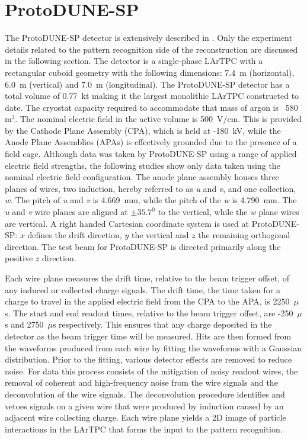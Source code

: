 \section{ProtoDUNE-SP}
\label{sec:protodunesp}
The ProtoDUNE-SP detector is extensively described in \cite{pdtdr}.  Only the experiment details related to the pattern recognition side of the reconstruction are discussed in the following section.  The detector is a single-phase LArTPC with a rectangular cuboid geometry with the following dimensions: 7.4~m (horizontal), 6.0~m (vertical) and 7.0~m (longitudinal).  The ProtoDUNE-SP detector has a total volume of 0.77~kt making it the largest monolithic LArTPC constructed to date.  The cryostat capacity required to accommodate that mass of argon is ~580~$\text{m}^{3}$.  The nominal electric field in the active volume is 500~V/cm.  This is provided by the Cathode Plane Assembly (CPA), which is held at -180~kV, while the Anode Plane Assemblies (APAs) is effectively grounded due to the presence of a field cage.  Although data was taken by ProtoDUNE-SP using a range of applied electric field strengths, the following studies show only data taken using the nominal electric field configuration.  The anode plane assembly houses three planes of wires, two induction, hereby referred to as \textit{u} and \textit{v}, and one collection, \textit{w}.  The pitch of \textit{u} and \textit{v} is 4.669~mm, while the pitch of the \textit{w} is 4.790~mm.  The \textit{u} and \textit{v} wire planes are aligned at $\pm35.7^{0}$ to the vertical, while the \textit{w} plane wires are vertical.  A right handed Cartesian coordinate system is used at ProtoDUNE-SP: $x$ defines the drift direction, $y$ the vertical and $z$ the remaining orthogonal direction.  The test beam for ProtoDUNE-SP is directed primarily along the positive $z$ direction.  

Each wire plane measures the drift time, relative to the beam trigger offset, of any induced or collected charge signals.  The drift time, the time taken for a charge to travel in the applied electric field from the CPA to the APA, is 2250~$\mu$s.  The start and end readout times, relative to the beam trigger offset, are -250~$\mu$s and 2750~$\mu$s respectively.  This ensures that any charge deposited in the detector as the beam trigger time will be measured.  Hits are then formed from the waveforms produced from each wire by fitting the waveforms with a Gaussian distribution.  Prior to the fitting, various detector effects are removed to reduce noise.  For data this process consists of the mitigation of noisy readout wires, the removal of coherent and high-frequency noise from the wire signals and the deconvolution of the wire signals.  The deconvolution procedure identifies and vetoes signals on a given wire that were produced by induction caused by an adjacent wire collecting charge.    Each wire plane yields a 2D image of particle interactions in the LArTPC that forms the input to the pattern recognition.

